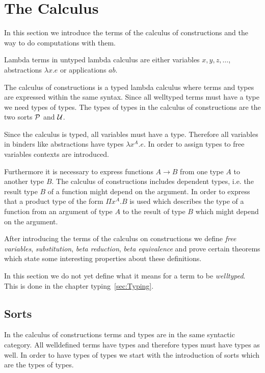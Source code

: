 \section{The Calculus}
\label{sec:Calculus}


In this section we introduce the terms of the calculus of constructions and the
way to do computations with them.

Lambda terms in untyped lambda calculus are either variables $x,y,z,\ldots$,
abstractions $\lambda x.e$ or applications $ab$.

The calculus of constructions is a typed lambda calculus where terms and types
are expressed within the same syntax. Since all welltyped terms must have a type
we need types of types. The types of types in the calculus of constructions are
the two sorts ${\cal P}$ and ${\cal U}$.

Since the calculus is typed, all variables must have a type. Therefore all
variables in binders like abstractions have types $\lambda x^A. e$. In order to
assign types to free variables contexts are introduced.


Furthermore it is necessary to express functions $A \to B$ from one type $A$ to
another type $B$. The calculus of constructions includes dependent types, i.e.
the result type $B$ of a function might depend on the argument. In order to
express that a product type of the form $\Pi x^A. B$ is used which describes the
type of a function from an argument of type $A$ to the result of type $B$ which
might depend on the argument.

After introducing the terms of the calculus on constructions we define
\emph{free variables}, \emph{substitution}, \emph{beta reduction}, \emph{beta
equivalence} and prove certain theorems which state some interesting properties
about these definitions.

In this section we do not yet define what it means for a term to be
\emph{welltyped}. This is done in the chapter typing~\ref{sec:Typing}.




\subsection{Sorts}


In the calculus of constructions terms and types are in the same
syntactic category. All welldefined terms have types and therefore types must
have types as well. In order to have types of types we start with the
introduction of sorts which are the types of types.

